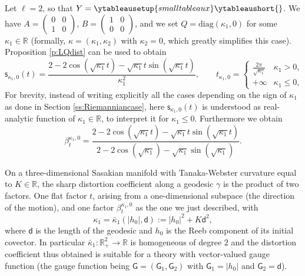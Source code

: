 \documentclass[11pt,a4paper]{article}
\theoremstyle{plain}
\theoremstyle{definition}
\theoremstyle{remark}
\numberwithin{equation}{section}
\newcommand{\R}{\mathbb{R}} %
\newcommand{\sfs}{\mathsf{s}}
\newcommand{\sfd}{\mathsf d}
\newcommand{\sfG}{\mathsf G}
\begin{document}
Let $\ell=2$, so that $Y=\ytableausetup{smalltableaux}\ytableaushort{\empty\empty}$. We have $A=\left(\begin{smallmatrix}0 & 0 \\ 1 & 0 \end{smallmatrix}\right)$, $B=\left( \begin{smallmatrix} 1 & 0 \\ 0 & 0\end{smallmatrix}\right)$, and we set $Q=\mathrm{diag}(\kappa_1,0)$ for some $\kappa_1 \in \R$ (formally, $\kappa=(\kappa_1,\kappa_2)$ with $\kappa_2=0$, which greatly simplifies this case). Proposition \ref{p:LQdist} can be used to obtain
\begin{equation}
\mathsf{\sfs}_{\kappa_1,0}(t) = 
\frac{2 -2 \cos \left(\sqrt{\kappa_1} t\right)-\sqrt{\kappa_1} t 
\sin \left(\sqrt{\kappa_1} t\right)}{\kappa_1^2}, 
\qquad t_{\kappa_1,0}
 = 
\begin{cases}
\tfrac{2\pi}{\sqrt{\kappa_1}} & \kappa_1>0, \\ +\infty & \kappa_1\leq 0,
\end{cases}
\end{equation}
For brevity, instead of writing explicitly all the cases depending on the sign of $\kappa_1$ as done in Section \ref{ss:Riemanniancase},  here $\mathsf{\sfs}_{\kappa_1,0}(t) $ is understood as real-analytic function of $\kappa_{1}\in \R$, to interpret it for $\kappa_1 \leq 0$. Furthermore we obtain
\begin{equation}
\beta_t^{\kappa_1,0} =  \frac{2-2 \cos \left(\sqrt{\kappa_1} t\right)-\sqrt{\kappa_1} t \sin \left(\sqrt{\kappa_1} t\right)}{2-2 \cos \left(\sqrt{\kappa_1}\right)-\sqrt{\kappa_1} \sin \left(\sqrt{\kappa_1}\right)}.
\end{equation}

On a three-dimensional Sasakian manifold with Tanaka-Webster curvature equal to $K\in \R$, the sharp distortion coefficient along a geodesic $\gamma$ is the product of two factors. One flat factor $t$, arising from a one-dimensional subspace (the direction of the motion), and one factor $\beta_t^{\kappa_1,0}$ as the one we just described, with 
\begin{equation}
\kappa_1=\bar{\kappa}_1(|h_0|,\sfd) := |h_0|^2+K \sfd^2,
\end{equation}
where $\sfd$ is the length of the geodesic and $h_0$ is the Reeb component of its initial covector. In particular $\bar{\kappa}_1 :\R^2_+ \to \R$ is homogeneous of degree $2$ and the distortion coefficient thus obtained is suitable for a theory with vector-valued gauge function (the gauge function being $\sfG = (\sfG_1,\sfG_2)$ with $\sfG_1=|h_0|$ and $\sfG_2=\sfd$).	
\end{document}

